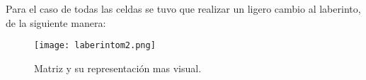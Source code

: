 Para el caso de todas las celdas se tuvo que realizar un ligero cambio al laberinto, de la siguiente manera:

\begin{figure}[H]
  \centering
    \texttt{[image: laberintom2.png]}
    \caption{Matriz y su representación mas visual.}
  \end{figure}